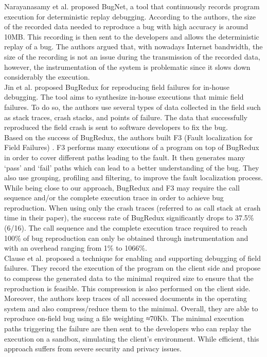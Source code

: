 \documentclass[times]{smrauth}
\begin{document}
Narayanasamy et al. \cite{Narayanasamy2005} proposed BugNet, a tool that continuously records program execution for deterministic replay debugging. According to the authors, the size of the recorded data needed to reproduce a bug with high accuracy is around 10MB. This recording is then sent to the developers and allows the deterministic replay of a bug. The authors argued that, with nowadays Internet bandwidth, the size of the recording is not an issue during the transmission of the recorded data, however, the instrumentation of the system is problematic since it slows down considerably the execution.\\

Jin et al. \cite{Jin2012} proposed BugRedux for reproducing field failures for in-house debugging. The tool aims to synthesize in-house executions that mimic field failures. To do so, the authors use several types of data collected in the field such as stack traces, crash stacks, and points of failure. 
The data that successfully reproduced the field crash is sent to software developers to fix the bug. \\

Based on the success of BugRedux, the authors built F3 (Fault localization for Field Failures) \cite{Jin2013}. 
F3 performs many executions of a program on top of BugRedux in order to cover different paths leading to the fault. It then generates many ‘pass’ and ‘fail’ paths which can lead to a better understanding of the bug. They also use grouping, profiling and filtering, to improve the fault localization process.\\

While being close to our approach, BugRedux and F3 may require the call sequence and/or the complete execution trace in order to achieve bug reproduction. When using only the crash traces (referred to as call stack at crash time in their paper), the success rate of BugRedux significantly drops to 37.5\% (6/16). The call sequence and the complete execution trace required to reach 100\% of bug reproduction can only be obtained through instrumentation and with an overhead ranging from 1\% to 1066\%.\\

Clause et al. \cite{Clause2007} proposed a technique for enabling and supporting debugging of field failures. 
They record the execution of the program on the client side and propose to compress the generated data to the minimal required size to ensure that the reproduction is feasible. 
This compression is also performed on the client side. Moreover, the authors keep traces of all accessed documents in the operating system and also compress/reduce them to the minimal. 
Overall, they are able to reproduce on-field bug using a file weighting ≈70Kb. The minimal execution paths triggering the failure are then sent to the developers who can replay the execution on a sandbox, simulating the client’s environment. While efficient, this approach suffers from severe security and privacy issues. \\
\end{document}
